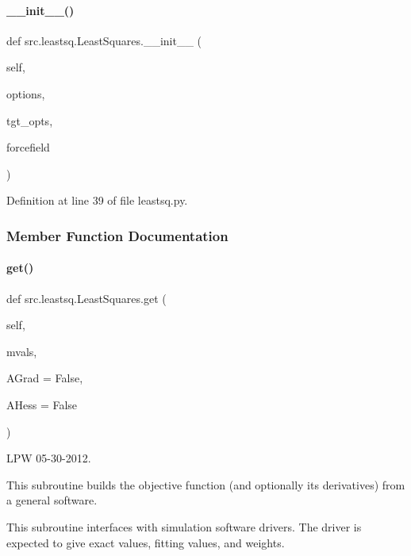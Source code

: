 \paragraph{\texorpdfstring{\+\_\+\+\_\+init\+\_\+\+\_\+()}{\_\_init\_\_()}}
{\footnotesize\ttfamily def src.\+leastsq.\+Least\+Squares.\+\_\+\+\_\+init\+\_\+\+\_\+ (\begin{DoxyParamCaption}\item[{}]{self,  }\item[{}]{options,  }\item[{}]{tgt\+\_\+opts,  }\item[{}]{forcefield }\end{DoxyParamCaption})}



Definition at line 39 of file leastsq.\+py.



\subsubsection{Member Function Documentation}
\mbox{\label{classsrc_1_1leastsq_1_1LeastSquares_a4e586dda3fc35ba842ca972bc296f1f3}} 
\paragraph{\texorpdfstring{get()}{get()}}
{\footnotesize\ttfamily def src.\+leastsq.\+Least\+Squares.\+get (\begin{DoxyParamCaption}\item[{}]{self,  }\item[{}]{mvals,  }\item[{}]{A\+Grad = {\ttfamily False},  }\item[{}]{A\+Hess = {\ttfamily False} }\end{DoxyParamCaption})}



L\+PW 05-\/30-\/2012. 

This subroutine builds the objective function (and optionally its derivatives) from a general software.

This subroutine interfaces with simulation software \textquotesingle{}drivers\textquotesingle{}. The driver is expected to give exact values, fitting values, and weights.


